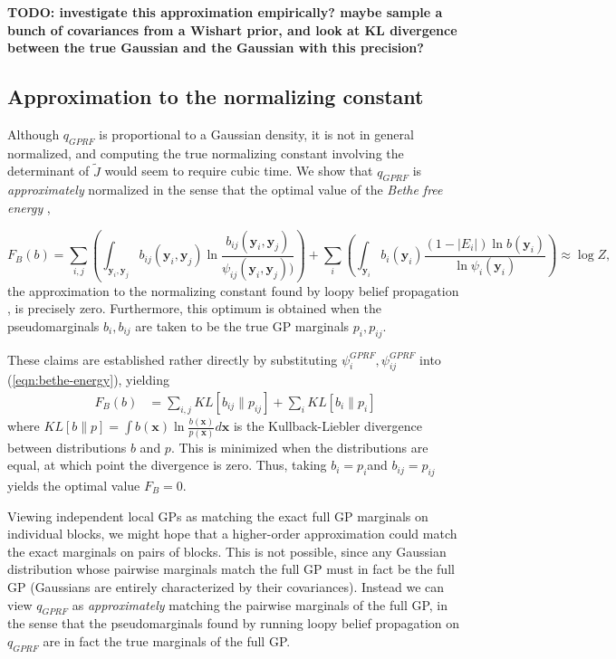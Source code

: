 \documentclass{article}
\renewcommand{\v}[1]{\mathbf{#1}}
\begin{document}
{\bf TODO: investigate this approximation empirically? maybe sample a
  bunch of covariances from a Wishart prior, and look at KL divergence
between the true Gaussian and the Gaussian with this precision?}

\subsection{Approximation to the normalizing constant}
\label{sec:approx-norm}

Although $q_{GPRF}$ is proportional to a Gaussian density, it is not
in general normalized, and computing the true normalizing constant involving the determinant of $\tilde{J}$ would seem to require
cubic time. We show
that $q_{GPRF}$ is {\em approximately} normalized in the sense that
the optimal value of the {\em Bethe free energy} \cite{bethe}, 

\begin{equation}
F_B(b) = \sum_{i,j} \left(\int_{\v{y}_i, \v{y}_j} b_{ij}(\v{y}_i,
  \v{y}_j) \ln \frac{b_{ij}(\v{y}_i,
  \v{y}_j)}{\psi_{ij}(\v{y}_i, \v{y}_j))}\right) +
\sum_i \left(\int_{\v{y}_i} b_i(\v{y}_i) \frac{(1-|E_i|)\ln
    b(\v{y}_i)}{\ln \psi_i(\v{y}_i)}\right)\label{eqn:bethe-energy} \approx \log Z,
\end{equation}
the approximation to the normalizing constant found by loopy belief
propagation \cite{loopybp}, is precisely zero. Furthermore, this
optimum is obtained when the pseudomarginals $b_i, b_{ij}$ are
taken to be the true GP marginals $p_i, p_{ij}$. 

These claims are established rather directly by substituting
$\psi_i^{GPRF}, \psi_{ij}^{GPRF}$ into (\ref{eqn:bethe-energy}), yielding
\begin{align}
F_B(b)&= \sum_{i,j} KL[b_{ij}\| p_{ij}] + \sum_i KL[b_i \| p_i]
\end{align}
where $KL[b\|p] = \int b(\v{x}) \ln \frac{b(\v{x})}{p(\v{x})}d\v{x}$
is the Kullback-Liebler divergence \cite{kl} between distributions $b$ and
$p$.  This is minimized when the distributions are equal, at which
point the divergence is zero. Thus, taking $b_i=p_i$and
$b_{ij}=p_{ij}$ yields the optimal value $F_B=0$.


Viewing independent local GPs as matching the exact full GP
marginals on individual blocks, we might hope that a
higher-order approximation could match the exact marginals on pairs of
blocks. This is not possible, since any Gaussian distribution whose
pairwise marginals match the full GP must in fact be the full GP
(Gaussians are entirely characterized by their covariances). Instead we
can view $q_{GPRF}$ as {\em approximately} matching the pairwise
marginals of the full GP, in the sense that the pseudomarginals found
by running loopy belief propagation on $q_{GPRF}$ are in fact the true
marginals of the full GP.
\end{document}
